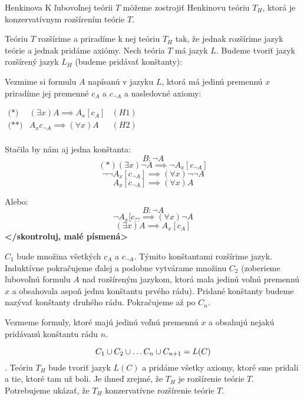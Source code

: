 \begin{veta}{Henkinova} 
    K ľubovoľnej teórii $T$ môžeme zostrojiť Henkinovu
    teóriu $T_H$, ktorá je konzervatívnym rozšírením teórie $T$.
\end{veta}    

\begin{dokaz}
    Teóriu $T$ rozšírime a priradíme k nej teóriu $T_H$ tak, že
    jednak rozšírime jazyk teórie a jednak pridáme axiómy.
    Nech teória $T$ má jazyk $L$.
    Budeme tvoriť jazyk rozšírený jazyk $L_H$ (budeme pridávať konštanty):


\par Vezmime si formulu $A$ napísanú v jazyku $L$, ktorá má jedinú premennú $x$
priradíme jej premenné $c_A$ a $c_{\neg A}$ a nasledovné axiomy: 

$
\begin{array}{lll}
\mbox{(*)} & (\exists x) A \implies A_x[c_A] & (H1) \\
\mbox{(**)} & A_x{c_{\neg A}} \implies (\forall x) A & (H2) \\
\end{array}
$

Stačila by nám aj jedna konštanta:
$$B: \neg A$$
$$ (*) (\exists x) \neg A \implies \neg A_x[c_{\neg A}]$$
$$\neg \neg A_x[c_{\neg A}] \implies (\forall x) \neg \neg A$$
$$A_x[c_{\neg A}] \implies (\forall x) A$$

Alebo:
$$B: \neg A$$
$$\neg A_x[c_{??} \implies (\forall x) \neg A$$
$$(\exists x) A \implies A_x[c_A]$$
\textbf{</skontroluj, malé písmená>}

\par $C_1$ bude množina všetkých $c_A$ a $c_{\neg A}$. Týmito konštantami
rozšírime jazyk. Induktívne pokračujeme ďalej a podobne vytvárame množinu $C_2$
(zoberieme ľubovoľnú formulu $A$ nad rozšíreným jazykom, ktorá mala jedinú voľnú
premennú $x$ a obsahovala aspoň jednu konštantu prvého rádu).
Pridané konštanty budeme nazývať konštanty druhého rádu. Pokračujeme až po
$C_n$.

\par Vezmeme formuly, ktoré majú jedinú voľnú premennú $x$ a obsahujú nejakú
pridávanú konštantu rádu $n$.

\par
$$C_1 \cup C_2 \cup \ldots C_n \cup C_{n+1} = L(C)$$. 
Teóriu $T_H$ bude tvoriť jazyk $L(C)$ a pridáme všetky axiomy, ktoré sme pridali
a tie, ktoré tam už boli. Je ihneď zrejmé, že $T_H$ je rozšírenie teórie $T$.
Potrebujeme ukázať, že $T_H$ konzervatívne rozšírenie teórie $T$.


\end{dokaz}
